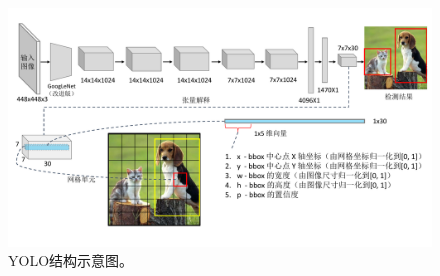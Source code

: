 \begin{figure}[!t]
	\centering
	\includegraphics[trim={0.5cm, 2cm, 0cm, 1cm}, clip,width=\textwidth]{./imgs/yolo.pdf}
	\caption{YOLO结构示意图。}
	\label{fig:yolo}
\end{figure}
